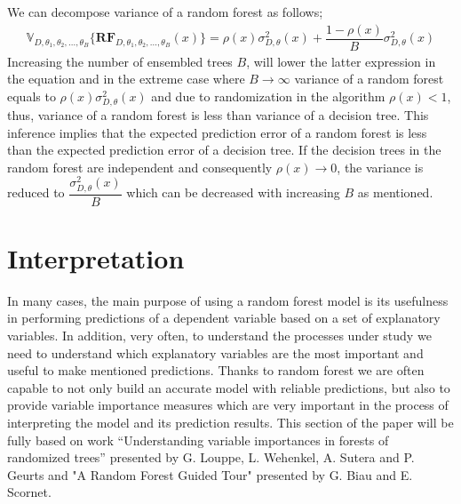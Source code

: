 We can decompose variance of a random forest as follows;
\begin{align}
\mathbb{V}_{D, \theta_{1}, \theta_{2},..., \theta_{B}}\{\boldsymbol{RF}_{D, \theta_{1},\theta_{2},..., \theta_{B}}(x) \}  = \rho(x)\sigma^2_{D,\theta}(x) + \dfrac{1-\rho(x)}{B}\sigma^2_{D,\theta}(x)
\end{align}
Increasing the number of ensembled trees $B$, will lower the latter expression in the equation and in the extreme case where $B \rightarrow \infty $ variance of a random forest equals to $\rho(x)\sigma^2_{D,\theta}(x)$ and due to randomization in the algorithm $\rho(x) < 1$, thus, variance of a random forest is less than variance of a decision tree. This inference implies that the expected prediction error of a random forest is less than the expected prediction error of a decision tree. If the decision trees in the random forest are independent and consequently $\rho(x) \rightarrow 0$, the variance is reduced to $\dfrac{\sigma^2_{D,\theta}(x)}{B}$ which can be decreased with increasing $B$ as mentioned.



\section{Interpretation}
In many cases, the main purpose of using a random forest model is its usefulness in performing predictions of a dependent variable based on a set of explanatory variables. In addition, very often, to understand the processes under study we need to understand which explanatory variables are the most important and useful to make mentioned predictions. Thanks to random forest we are often capable to not only build an accurate model with reliable predictions, but also to provide variable importance measures which are very important in the process of interpreting the model and its prediction results. This section of the paper will be fully based on work “Understanding variable importances in forests of randomized trees” presented by G. Louppe, L. Wehenkel, A. Sutera and P. Geurts and "A Random Forest Guided Tour" presented by G. Biau and E. Scornet.

